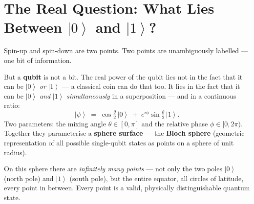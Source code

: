 
\providecommand{\ket}[1]{\left|#1\right\rangle}
\providecommand{\bra}[1]{\left\langle#1\right|}
\providecommand{\braket}[2]{\left\langle#1\middle|#2\right\rangle}

\section{The Real Question: What Lies Between \texorpdfstring{$\ket{0}$}{|0>}
  and \texorpdfstring{$\ket{1}$}{|1>}?}
\label{sec:between}

Spin-up and spin-down are two points.
Two points are unambiguously labelled --- one bit of information.

But a \textbf{qubit} is not a bit.
The real power of the qubit lies not in
the fact that it can be $\ket{0}$ \emph{or} $\ket{1}$ ---
a classical coin can do that too.
It lies in the fact that it can be $\ket{0}$ \emph{and} $\ket{1}$
\emph{simultaneously} in a superposition ---
and in a continuous ratio:
\begin{equation}
  \ket{\psi} \;=\; \cos\!\tfrac{\theta}{2}\,\ket{0}
  \;+\; e^{i\phi}\sin\!\tfrac{\theta}{2}\,\ket{1}.
\end{equation}
Two parameters: the mixing angle $\theta \in [0,\pi]$
and the relative phase $\phi \in [0, 2\pi)$.
Together they parameterise a \textbf{sphere surface} ---
the \textbf{Bloch sphere} (geometric representation of
all possible single-qubit states as points
on a sphere of unit radius).

On this sphere there are \emph{infinitely many points} ---
not only the two poles $\ket{0}$ (north pole) and
$\ket{1}$ (south pole), but the entire equator,
all circles of latitude, every point in between.
Every point is a valid, physically
distinguishable quantum state.

